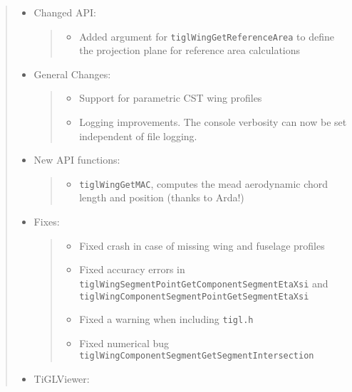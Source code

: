 \documentclass[]{scrartcl}
\begin{document}
\begin{quote}
\begin{itemize}
\item
  Changed API:

  \begin{quote}
  \begin{itemize}
  \itemsep1pt\parskip0pt
  \item
    Added argument for \texttt{tiglWingGetReferenceArea} to define the
    projection plane for reference area calculations
  \end{itemize}
  \end{quote}
\item
  General Changes:

  \begin{quote}
  \begin{itemize}
  \itemsep1pt\parskip0pt
  \item
    Support for parametric CST wing profiles
  \item
    Logging improvements. The console verbosity can now be set
    independent of file logging.
  \end{itemize}
  \end{quote}
\item
  New API functions:

  \begin{quote}
  \begin{itemize}
  \itemsep1pt\parskip0pt
  \item
    \texttt{tiglWingGetMAC}, computes the mead aerodynamic chord length
    and position (thanks to Arda!)
  \end{itemize}
  \end{quote}
\item
  Fixes:

  \begin{quote}
  \begin{itemize}
  \itemsep1pt\parskip0pt
  \item
    Fixed crash in case of missing wing and fuselage profiles
  \item
    Fixed accuracy errors in
    \texttt{tiglWingSegmentPointGetComponentSegmentEtaXsi} and
    \texttt{tiglWingComponentSegmentPointGetSegmentEtaXsi}
  \item
    Fixed a warning when including \texttt{tigl.h}
  \item
    Fixed numerical bug
    \texttt{tiglWingComponentSegmentGetSegmentIntersection}
  \end{itemize}
  \end{quote}
\item
  TiGLViewer:


\end{itemize}
\end{quote}
\end{document}
